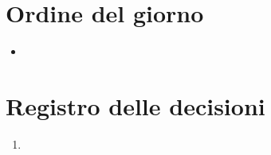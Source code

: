 \documentclass{article}
\begin{document}
\placeholder{\dots}

\section{Ordine del giorno}%
\label{sec:ordine_del_giorno}

\begin{itemize}
  \item \placeholder{\dots}
\end{itemize}

\placeholder{\dots}

\newpage
\section{Registro delle decisioni}%
\label{sec:registro_delle_decisioni}

\begin{enumerate}
  \item \placeholder{\dots}
\end{enumerate}
\end{document}
